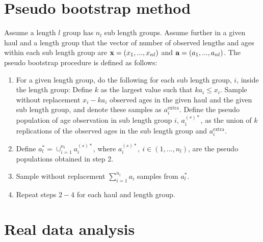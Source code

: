 \documentclass[a4paper 12pt]{article}
\numberwithin{equation}{section}
\begin{document}
\section{Pseudo bootstrap method}
\label{secAp:pseudobootstrap}
Assume a length $l$ group has $n_{l}$ sub length groups. Assume further in a given haul and a length group that the vector of number of observed lengths and ages within each sub length group are ${\bf x} = \left(x_{1},...,x_{nl}\right)$ and ${\bf a} = \left(a_{1},...,a_{nl}\right)$.  The pseudo bootstrap procedure is defined as follows:

\begin{enumerate}
\item For a given length group, do the following for each sub length group, $i$, inside the length group: Define $k$ as the largest value such that $ka_{i} \leq x_{i}$. Sample without replacement $x_{i} - k a_{i}$ observed ages in the given haul and the given sub length group, and denote these samples as $a^{\mathrm{extra}}_{i}$. Define the pseudo population of age observation in sub length group $i$, $a^{(s)*}_{i}$, as the union of $k$ replications of the observed ages in the sub length group and $a^{\mathrm{extra}}_{i}$.

\item Define $a^{*}_{l} = \cup_{i = 1}^{n_{l}} a^{(s)*}_{i} $, where $a^{(s)*}_{i}, \ i \in \left(1,...,n_{l} \right)$, are the pseudo populations obtained in step 2.

\item Sample without replacement $\sum_{i = 1}^{n_{l}} a_{i}$ samples from $a^{*}_{l} $.

\item Repeat steps $2-4$ for each haul and length group.
\end{enumerate}

\clearpage

\section{Real data analysis}
\label{secAP:realdataanalysis}
\end{document}
